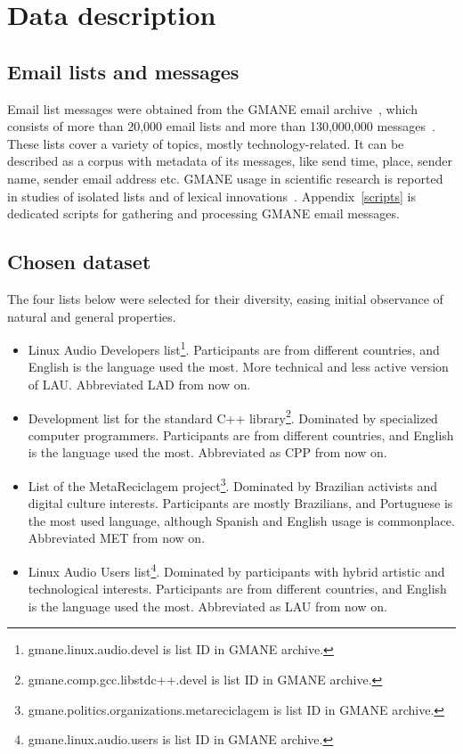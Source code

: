 \documentclass[%
 aip,
 jmp,%
 amsmath,amssymb,
 reprint,%
]{revtex4-1}
\begin{document}
\section{Data description}
    \subsection{Email lists and messages}
Email list messages were obtained from
the GMANE email archive~\cite{GMANE}, which consists of more than 20,000 email lists and more than 130,000,000 messages~\cite{GMANEwikipedia}. These lists cover a variety of topics, mostly technology-related. It can be described as a corpus with metadata of its messages, like send time, place, sender name, sender email address etc.
GMANE usage in scientific research is reported in studies of isolated lists and of lexical innovations~\cite{GMANE2,bird}. Appendix~\ref{scripts} is dedicated scripts for gathering and processing GMANE email messages.


    \subsection{Chosen dataset}
The four lists below were selected for their diversity, easing initial observance of natural and general properties.
\begin{itemize}
    \item Linux Audio Developers list\footnote{gmane.linux.audio.devel is list ID in GMANE archive.}. Participants are from different countries, and English is the language used the most. More technical and less active version of LAU. Abbreviated LAD from now on.
    \item Development list for the standard C++ library\footnote{gmane.comp.gcc.libstdc++.devel is list ID in GMANE archive.}. Dominated by specialized computer programmers. Participants are from different countries, and English is the language used the most. Abbreviated as CPP from now on.
    \item List of the MetaReciclagem project\footnote{gmane.politics.organizations.metareciclagem is list ID in GMANE archive.}. Dominated by Brazilian activists and digital culture interests. Participants are mostly Brazilians, and Portuguese is the most used language, although Spanish and English usage is commonplace. Abbreviated MET from now on.
    \item Linux Audio Users list\footnote{gmane.linux.audio.users is list ID in GMANE archive.}. Dominated by participants with hybrid artistic and technological interests. Participants are from different countries, and English is the language used the most. Abbreviated as LAU from now on.
\end{itemize} 
\end{document}
